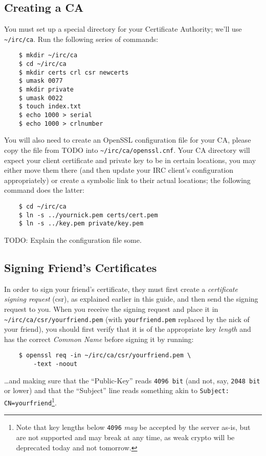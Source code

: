 \documentclass{article}
\begin{document}
{\subsection{Creating a CA}
You must set up a special directory for your Certificate Authority; we'll use \texttt{\textasciitilde /irc/ca}.  Run the following series of commands:
\begin{lstlisting}
    $ mkdir ~/irc/ca
    $ cd ~/irc/ca
    $ mkdir certs crl csr newcerts
    $ umask 0077
    $ mkdir private
    $ umask 0022
    $ touch index.txt
    $ echo 1000 > serial
    $ echo 1000 > crlnumber
\end{lstlisting}
You will also need to create an OpenSSL configuration file for your CA, please copy the file from TODO into \texttt{\textasciitilde /irc/ca/openssl.cnf}.  Your CA directory will expect your client certificate and private key to be in certain locations, you may either move them there (and then update your IRC client's configuration appropriately) or create a symbolic link to their actual locations; the following command does the latter:
\begin{lstlisting}
    $ cd ~/irc/ca
    $ ln -s ../yournick.pem certs/cert.pem
    $ ln -s ../key.pem private/key.pem
\end{lstlisting}
TODO: Explain the configuration file some.

\subsection{Signing Friend's Certificates}
In order to sign your friend's certificate, they must first create a \textit{certificate signing request} (csr), as explained earlier in this guide, and then send the signing request to you.  When you receive the signing request and place it in \texttt{\textasciitilde /irc/ca/csr/yourfriend.pem} (with \texttt{yourfriend.pem} replaced by the nick of your friend), you should first verify that it is of the appropriate key \textit{length} and has the correct \textit{Common Name} before signing it by running:
\begin{lstlisting}
    $ openssl req -in ~/irc/ca/csr/yourfriend.pem \
        -text -noout
\end{lstlisting}
\ldots and making sure that the ``Public-Key'' reads \texttt{4096 bit} (and not, say, \texttt{2048 bit} or lower) and that the ``Subject'' line reads something akin to \texttt{Subject: CN=yourfriend}\footnote{Note that key lengths below \texttt{4096} \textit{may} be accepted by the server as-is, but are not supported and may break at any time, as weak crypto will be deprecated today and not tomorrow.}.

}
\end{document}

